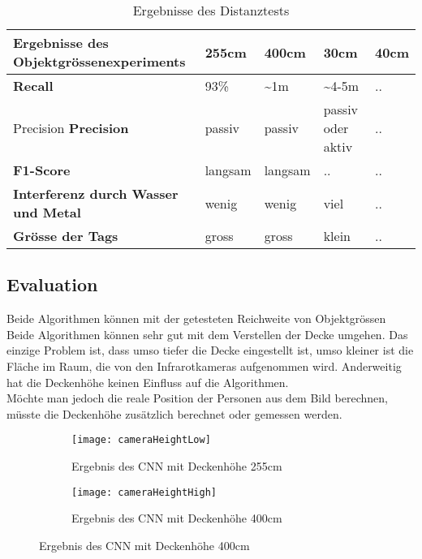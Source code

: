 \begin{table}[H]
	\begin{tabularx}{\textwidth}{|X|X|X|X|X|}
		\hline
		\textbf{Ergebnisse des Objektgrössenexperiments} & \textbf{255cm} & \textbf{400cm} & \textbf{30cm} & \textbf{40cm}\\
		\hline 
		\textbf{Recall} & 93\% & \textasciitilde 1m & \textasciitilde 4-5m & ..\\
		\hline  Precision
		\textbf{Precision} & passiv & passiv & passiv oder aktiv & ..\\
		\hline
		\textbf{F1-Score} & langsam & langsam & .. & ..\\
		\hline
		\textbf{Interferenz durch Wasser und Metal} & wenig & wenig & viel & ..\\
		\hline
		\textbf{Grösse der Tags} & gross & gross & klein & ..\\
		\hline
	\end{tabularx}
	\caption{Ergebnisse des Distanztests}
	\label{tbl:distance}
\end{table}

\subsection{Evaluation}
Beide Algorithmen können mit der getesteten Reichweite von Objektgrössen 
Beide Algorithmen können sehr gut mit dem Verstellen der Decke umgehen. Das einzige Problem ist, dass umso tiefer die Decke eingestellt ist, umso kleiner ist die Fläche im Raum, die von den Infrarotkameras aufgenommen wird. Anderweitig hat die Deckenhöhe keinen Einfluss auf die Algorithmen.\\
Möchte man jedoch die reale Position der Personen aus dem Bild berechnen, müsste die Deckenhöhe zusätzlich berechnet oder gemessen werden.

\begin{figure}[H]
	\begin{subfigure}{.45\linewidth}
		\centering
		\texttt{[image: cameraHeightLow]}
		\caption{Ergebnis des \gls{CNN} mit Deckenhöhe 255cm}
		\label{fig:cameraHeightLow}
	\end{subfigure}
	\begin{subfigure}{.45\linewidth}
		\centering
		\texttt{[image: cameraHeightHigh]}
		\caption{Ergebnis des \gls{CNN} mit Deckenhöhe 400cm}
		\label{fig:cameraHeightHigh}
	\end{subfigure}
\end{figure}


